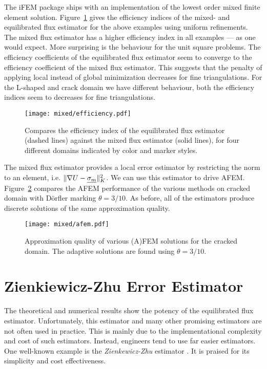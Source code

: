 \documentclass[thesis.tex]{subfiles}
\begin{document}
The iFEM package ships with an implementation of the lowest order mixed finite element solution. Figure~\ref{fig:effmixed} gives the efficiency
indices of the mixed- and equilibrated flux estimator for the above examples using uniform refinements. 
The mixed flux estimator has a higher efficiency index in all examples --- as one would expect. 
More surprising is the behaviour for the unit square problems. The efficiency coefficients of the equilibrated flux estimator
seem to  converge to the efficiency coefficient of the mixed flux estimator. This suggests that the penalty of applying
local instead of global minimization decreases for fine triangulations. For the L-shaped and crack domain we have different behaviour,
both the efficiency indices seem to decreases for fine triangulations. 
\begin{figure}
  \centering
  \texttt{[image: mixed/efficiency.pdf]}
  \caption{
    Compares the efficiency index of the equilibrated flux estimator (dashed lines) against the mixed flux estimator (solid lines), for
  four different domains indicated by color and marker styles.}
  \label{fig:effmixed}
\end{figure}

The mixed flux estimator provides a local error estimator by restricting the norm to an element, i.e. $\| \nabla U - \underline{\sigma_m} \|^2_K$. We
can use this estimator to drive AFEM. Figure~\ref{fig:afemmixed} compares the AFEM performance of the various methods on cracked domain with D\"orfler
marking $\theta = 3/10$.  As before, all of the estimators produce discrete solutions of the same approximation quality. 
\begin{figure}
  \centering
  \texttt{[image: mixed/afem.pdf]}
  \caption{
    Approximation quality of various (A)FEM solutions for the cracked domain. The adaptive solutions are found using $\theta = 3/10$.
  }
  \label{fig:afemmixed}
\end{figure}
\section{Zienkiewicz-Zhu Error Estimator}
The theoretical and numerical results show the potency of the equilibrated flux estimator. Unfortunately, this estimator and many other promising
estimators are not often used in practice. This is mainly due to the implementational complexity and cost of such estimators.
Instead, engineers tend to use far easier estimators. One well-known example is the \emph{Zienkewicz-Zhu} estimator 
\cite{zienkiewicz1987simple, zienkiewicz1992superconvergent}. It is praised for its simplicity and cost effectiveness.
\end{document}
